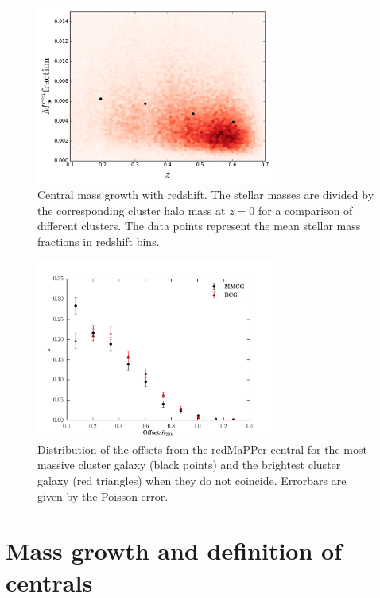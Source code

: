{\begin{figure}\centering
\includegraphics[width=0.7\textwidth]{./chapters/chapter6/figs/BCG_growth.png}
\caption{Central mass growth with redshift. The stellar masses are divided by the corresponding cluster halo mass at $z=0$ for a comparison of different clusters. The data points represent the mean stellar mass fractions in redshift bins. }\label{fig:mcengrowth}\end{figure}

\begin{figure}\centering
\includegraphics[width=0.7\textwidth]{./chapters/chapter6/figs/offsets.png}
\caption{Distribution of the offsets from the redMaPPer central for the most massive cluster galaxy (black points) and the brightest cluster galaxy (red triangles) when they do not coincide. Errorbars are given by the Poisson error.}\label{offsetsfig}\end{figure}

\section{Mass growth and definition of centrals}\label{sec:centrals}

}

